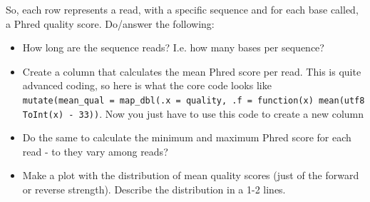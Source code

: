 \documentclass[
  letterpaper,
  DIV=11,
  numbers=noendperiod]{scrreprt}
\providecommand{\tightlist}{%
  \setlength{\itemsep}{0pt}\setlength{\parskip}{0pt}}\usepackage{longtable,booktabs,array}
\begin{document}
So, each row represents a read, with a specific sequence and for each
base called, a Phred quality score. Do/answer the following:

\begin{itemize}
\tightlist
\item
  How long are the sequence reads? I.e. how many bases per sequence?
\item
  Create a column that calculates the mean Phred score per read. This is
  quite advanced coding, so here is what the core code looks like
  \texttt{mutate(mean\_qual\ =\ map\_dbl(.x\ =\ quality,\ .f\ =\ function(x)\ mean(utf8ToInt(x)\ -\ 33))}.
  Now you just have to use this code to create a new column
\item
  Do the same to calculate the minimum and maximum Phred score for each
  read - to they vary among reads?
\item
  Make a plot with the distribution of mean quality scores (just of the
  forward or reverse strength). Describe the distribution in a 1-2
  lines.
\end{itemize}
\end{document}
